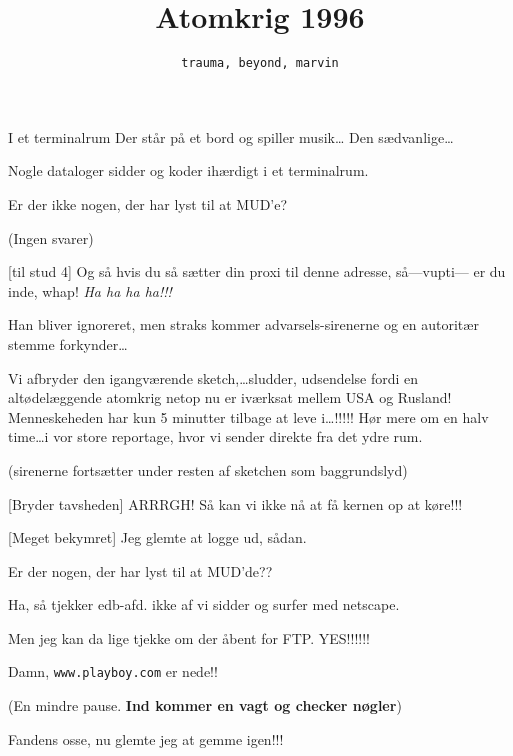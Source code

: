 \documentclass[10pt]{article}
\title{Atomkrig 1996}
\author{\tt{trauma}, \tt{beyond}, \tt{marvin}}
\begin{document}
\maketitle

\begin{sketch}

\begin{roles}
   I et terminalrum 
   Der står på et bord og spiller musik\ldots
   Den sædvanlige\ldots
\end{roles}

\scene Nogle dataloger sidder og koder ihærdigt i et terminalrum.

 Er der ikke nogen, der har lyst til at MUD'e?

\scene (Ingen svarer)

 [til stud 4] Og så hvis du så sætter din proxi til denne
adresse, så---vupti--- er du inde, whap! {\em Ha ha ha ha!!!}

\scene Han bliver ignoreret, men straks kommer advarsels-sirenerne
og en autoritær stemme forkynder\ldots

 Vi afbryder den igangværende sketch,\ldots sludder,
udsendelse fordi en alt\-ødelæggende atomkrig netop nu er iværksat mellem
USA og Rusland! Menneskeheden har kun 5 minutter tilbage at leve
i\ldots!!!!! Hør mere om en halv time\ldots i vor store reportage, hvor vi
sender direkte fra det ydre rum.

\scene (sirenerne fortsætter under resten af sketchen som baggrundslyd)


 [Bryder tavsheden] ARRRGH! Så kan vi ikke nå at få kernen op
at køre!!!

 [Meget bekymret] Jeg glemte at logge ud, sådan.

 Er der nogen, der har lyst til at MUD'de??

 Ha, så tjekker edb-afd. ikke af vi sidder og surfer med
netscape.

 Men jeg kan da lige tjekke om der åbent for FTP. YES!!!!!!

 Damn, {\tt www.playboy.com} er nede!!

\scene (En mindre pause. {\bf Ind kommer en vagt og checker nøgler})

 Fandens osse, nu glemte jeg at gemme igen!!!


\end{sketch}
\end{document}

